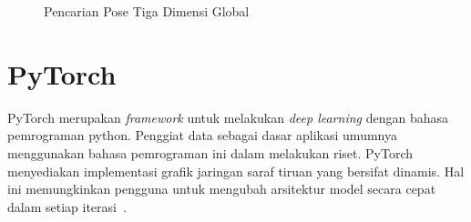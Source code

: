 \begin{figure}[htbp]
    \begin{center}
    \end{center}
    \vspace{-20pt}
    \captionsetup{labelfont=bf, textfont=bf}
    \caption{Pencarian Pose Tiga Dimensi Global}
    \vspace{-10pt}
    \captionsetup{labelfont=md, textfont=md}
    \label{fig:global}
\end{figure}

\section{PyTorch}
\label{sec:2-PyTorch}

PyTorch merupakan \textit{framework} untuk melakukan \textit{deep learning} dengan bahasa pemrograman
python. Penggiat data sebagai dasar aplikasi umumnya menggunakan bahasa pemrograman ini dalam melakukan
riset. PyTorch menyediakan implementasi grafik jaringan saraf tiruan yang bersifat dinamis. Hal
ini memungkinkan pengguna untuk mengubah arsitektur model secara cepat dalam setiap iterasi~\cite{2019arXiv191201703P}.


